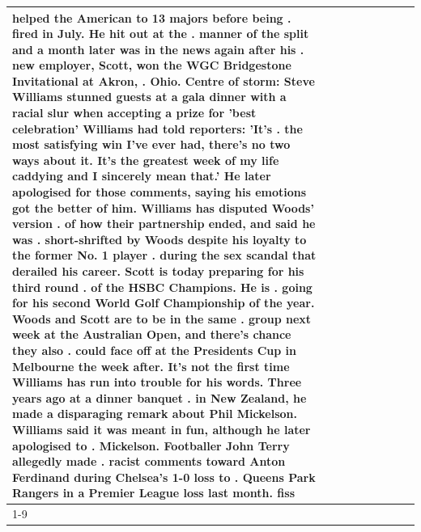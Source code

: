\begin{table}[H]
\begin{tabular}{lllrlllll}
helped the American to 13 majors before being . fired in July. He hit out at the . manner of the split and a month later was in the news again after his . new employer, Scott, won the WGC Bridgestone Invitational at Akron, . Ohio. Centre of storm: Steve Williams stunned guests at a gala dinner with a racial slur when accepting a prize for 'best celebration' Williams had told reporters: 'It's . the most satisfying win I've ever had, there's no two ways about it. It's the greatest week of my life caddying and I sincerely mean that.' He later apologised for those comments, saying his emotions got the better of him. Williams has disputed Woods' version . of how their partnership ended, and said he was . short-shrifted by Woods despite his loyalty to the former No. 1 player . during the sex scandal that derailed his career. Scott is today preparing for his third round . of the HSBC Champions. He is . going for his second World Golf Championship of the year. Woods and Scott are to be in the same . group next week at the Australian Open, and there's chance they also . could face off at the Presidents Cup in Melbourne the week after. It's not the first time Williams has run into trouble for his words. Three years ago at a dinner banquet . in New Zealand, he made a disparaging remark about Phil Mickelson. Williams said it was meant in fun, although he later apologised to . Mickelson. Footballer John Terry allegedly made . racist comments toward Anton Ferdinand during Chelsea's 1-0 loss to . Queens Park Rangers in a Premier League loss last month. fiss \\
\cline{1-9}

\end{tabular}
\end{table}
